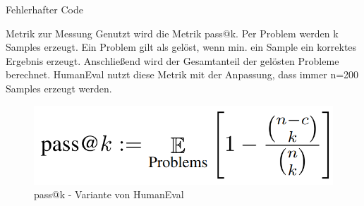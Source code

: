\documentclass{beamer}              %
\begin{document}
\begin{frame}{Fehlerhafter Code}
\begin{frame}{Metrik zur Messung}
Genutzt wird die Metrik pass@k. Per Problem werden k Samples erzeugt. Ein Problem gilt als gelöst, wenn min. ein Sample ein korrektes Ergebnis erzeugt. Anschließend wird der Gesamtanteil der gelösten Probleme berechnet. HumanEval nutzt diese Metrik mit der Anpassung, dass immer n=200 Samples erzeugt werden.
    \begin{figure}
        \centering
        \includegraphics[width=0.6\paperwidth]{images/passk.png}
        \caption{pass@k - Variante von HumanEval\cite{chen2021evaluating}}
    \end{figure}
\end{frame}



\end{frame}
\end{document}

